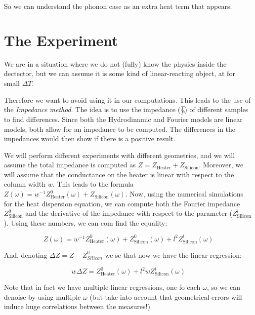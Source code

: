 \documentclass[a4paper, 11pt]{article}
\begin{document}
So we can understand the phonon case as an extra heat term that appears.




\section{The Experiment} %
\label{sec:the_experiment}

We are in a situation where we do not (fully) know the physics inside the dectector, but we can assume it is some kind of linear-reacting object, at for small $\Delta{T}$.

Therefore we want to avoid using it in our computations. This leads to the use of the \textit{Impedance method}. The idea is to use the impedance ($\frac{T}{P}$) of different samples to find differences. Since both the Hydrodinamic and Fourier models are linear models, both allow for an impedance to be computed. The differences in the impedances would then show if there is a positive result. 

We will perform different experiments with different geometries, and we will assume the total impedance is computed as $Z = Z_{\text{Heater}} + Z_{\text{Silicon}} $. Moreover, we will assume that the conductance on the heater is linear  with respect to the column width $w$. This leads to the formula $Z(\omega) = w^{-1}Z^0_{\text{Heater}}(\omega) + Z_{\text{Silicon}}(\omega)$. Now, using the numerical simulations for the heat dispersion equation, we can compute both the Fourier impedance $Z^0_{\text{Silicon}}$ and the derivative of the impedance with respect to the parameter ($Z^l_{\text{Silicon}}$). Using these numbers, we can com find the equality:

\begin{equation}
	Z(\omega) = w^{-1} Z^0_{\text{Heater}}(\omega) + Z^0_{\text{Silicon}}(\omega) + l^2 Z^l_{\text{Silicon}}(\omega)
\end{equation}


And, denoting $\Delta Z = Z-Z^0_{Silicon}$ we se that now we have the linear regression:

\begin{equation}
	w \Delta Z = Z^0_{\text{Heater}}(\omega)  +  l^2 w Z^l_{\text{Silicon}}(\omega) 
\end{equation}

Note that in fact we have multiple linear regressions, one fo each $\omega$, so we can denoise by using multiple $\omega$ (but take into account that geometrical errors   will induce huge correlations between the measures!)

\end{document}
